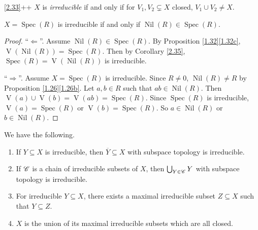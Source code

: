 \begin{customdefinition}{\ref{2.33}++}
    $X$ is \emph{irreducible} if and only if for $V_1,V_2 \subsetneq X$ closed, $V_1 \cup V_2 \neq X$.
\end{customdefinition}

\begin{proposition}\label{2.39}
    $X = \operatorname{Spec}(R)$ is irreducible if and only if $\operatorname{Nil}(R) \in \operatorname{Spec}(R)$. 
\end{proposition}

\begin{proof}
    ``$\Leftarrow$''. Assume $\operatorname{Nil}(R) \in \operatorname{Spec}(R)$. By Proposition \ref{1.32}\ref{1.32c}, $\operatorname{V}(\operatorname{Nil}(R)) = \operatorname{Spec}(R)$. Then by Corollary \ref{2.35}, $\operatorname{Spec}(R) = \operatorname{V}(\operatorname{Nil}(R))$ is irreducible. \par 
    ``$\Rightarrow$''. Assume $X = \operatorname{Spec}(R)$ is irreducible. Since $R \neq 0$, $\operatorname{Nil}(R) \neq R$ by Proposition \ref{1.26}\ref{1.26b}. Let $a,b \in R$ such that $ab \in \operatorname{Nil}(R)$. Then $\operatorname{V}(a) \cup \operatorname{V}(b) = \operatorname{V}(ab) = \operatorname{Spec}(R)$. Since $\operatorname{Spec}(R)$ is irreducible, $\operatorname{V}(a) = \operatorname{Spec}(R)$ or $\operatorname{V}(b) = \operatorname{Spec}(R)$. So $a \in \operatorname{Nil}(R)$ or $b \in \operatorname{Nil}(R)$.
\end{proof}

\begin{proposition}\label{2.40}
    We have the following.
    \begin{enumerate}
        \item\label{2.40a} If $Y \subseteq X$ is irreducible, then $\overbar Y \subseteq X$ with subspace topology is irreducible.
        \item\label{2.40b} If $\mathscr{C}$ is a chain of irreducible subsets of $X$, then $\bigcup_{Y \in \mathscr{C}}Y$ with subspace topology is irreducible.
        \item\label{2.40c} For irreducible $Y \subseteq X$, there exists a maximal irreducible subset $Z \subseteq X$ such that $Y \subseteq Z$.
        \item\label{2.40d} $X$ is the union of its maximal irreducible subsets which are all closed. 
    \end{enumerate}
\end{proposition}


